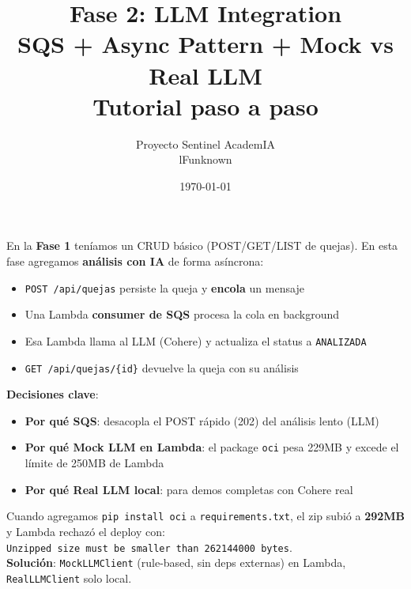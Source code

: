\documentclass[11pt,a4paper,oneside]{article}
\title{\Huge\textbf{Fase 2: LLM Integration} \\[0.3em]
       \Large SQS + Async Pattern + Mock vs Real LLM \\[0.5em]
       \normalsize Tutorial paso a paso}
\author{Proyecto Sentinel AcademIA \\ \small lFunknown}
\date{\today}
\begin{document}
\maketitle
\thispagestyle{empty}

\begin{tcolorbox}[colback=blue!5!white,colframe=infoblue,title={\textbf{¿Qué construimos en este tutorial?}}]
En la \textbf{Fase 1} ten\'iamos un CRUD b\'asico (POST/GET/LIST de quejas). En esta fase agregamos \textbf{an\'alisis con IA} de forma as\'incrona:

\begin{itemize}
  \item \texttt{POST /api/quejas} persiste la queja y \textbf{encola} un mensaje
  \item Una Lambda \textbf{consumer de SQS} procesa la cola en background
  \item Esa Lambda llama al LLM (Cohere) y actualiza el status a \texttt{ANALIZADA}
  \item \texttt{GET /api/quejas/\{id\}} devuelve la queja con su an\'alisis
\end{itemize}

\textbf{Decisiones clave}:
\begin{itemize}
  \item \textbf{Por qu\'e SQS}: desacopla el POST r\'apido (202) del an\'alisis lento (LLM)
  \item \textbf{Por qu\'e Mock LLM en Lambda}: el package \texttt{oci} pesa 229MB y excede el l\'imite de 250MB de Lambda
  \item \textbf{Por qu\'e Real LLM local}: para demos completas con Cohere real
\end{itemize}
\end{tcolorbox}

\begin{tcolorbox}[colback=warnorange!5!white,colframe=warnorange,title={\textbf{Trampa de la fase: el l\'imite de 250MB de Lambda}}]
Cuando agregamos \texttt{pip install oci} a \texttt{requirements.txt}, el zip subi\'o a \textbf{292MB} y Lambda rechaz\'o el deploy con: \\
\texttt{Unzipped size must be smaller than 262144000 bytes}. \\
\textbf{Soluci\'on}: \texttt{MockLLMClient} (rule-based, sin deps externas) en Lambda, \texttt{RealLLMClient} solo local.
\end{tcolorbox}

\tableofcontents
\newpage

\end{document}
